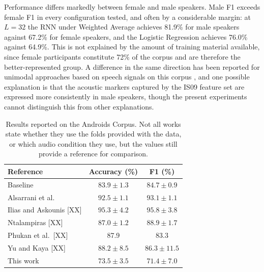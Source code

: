 \documentclass{mproj}
\begin{document}
Performance differs markedly between female and male speakers. Male F1 exceeds female F1 in every configuration tested, and often by a considerable margin: at $L = 32$ the RNN under Weighted Average achieves 81.9\% for male speakers against 67.2\% for female speakers, and the Logistic Regression achieves 76.0\% against 64.9\%. This is not explained by the amount of training material available, since female participants constitute 72\% of the corpus and are therefore the better-represented group. A difference in the same direction has been reported for unimodal approaches based on speech signals on this corpus \cite{alsarrani2025}, and one possible explanation is that the acoustic markers captured by the IS09 feature set are expressed more consistently in male speakers, though the present experiments cannot distinguish this from other explanations.

\begin{table}[htbp]
  \centering
  \caption{Results reported on the Androids Corpus. Not all works state whether
  they use the folds provided with the data, or which audio condition they use,
  but the values still provide a reference for comparison.}
  \label{tab:published}
  \begin{tabular}{lcc}
    \toprule
    Reference               & Accuracy (\%)   & F1 (\%) \\
    \midrule
    Baseline \cite{tao2023androids}        & $83.9 \pm 1.3$  & $84.7 \pm 0.9$ \\
    Alsarrani et al.\ \cite{alsarrani2025} & $92.5 \pm 1.1$  & $93.1 \pm 1.1$ \\
    Ilias and Askounis [XX] & $95.3 \pm 4.2$  & $95.8 \pm 3.8$ \\
    Ntalampiras [XX]        & $87.0 \pm 1.2$  & $88.9 \pm 1.7$ \\
    Phukan et al.\ [XX]     & 87.9            & 83.3 \\
    Yu and Kaya [XX]        & $88.2 \pm 8.5$  & $86.3 \pm 11.5$ \\
    \midrule
    This work               & $73.5 \pm 3.5$  & $71.4 \pm 7.0$ \\
    \bottomrule
  \end{tabular}
\end{table}
\end{document}
